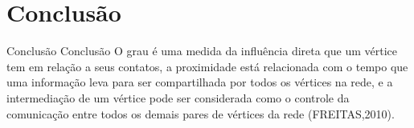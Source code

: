 \documentclass[10pt]{beamer}
\begin{document}
\section{Conclusão}
\begin{frame}{Conclusão }{Conclusão}
O grau é uma medida da influência direta que um vértice tem em relação a seus contatos, a 
proximidade está relacionada com o tempo que uma informação leva para ser compartilhada por todos os vértices na rede, e a intermediação de um vértice pode ser considerada como o controle da comunicação entre todos os demais pares de vértices da rede (FREITAS,2010). 
\end{frame}
{\aauwavesbg
\begin{frame}
\end{frame}}
\end{document}
